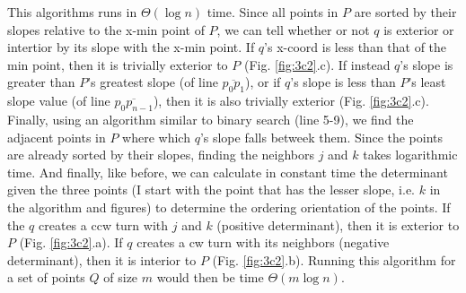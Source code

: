 \documentclass [12pt]{article}
\begin{document}
\begin{enumerate}[label=(\alph*)]
        This algorithms runs in $\Theta(\log n)$ time. Since all points in $P$ are sorted by their slopes relative to the x-min point of $P$, we can tell whether or not $q$ is exterior or intertior by its slope with the x-min point. If $q$'s x-coord is less than that of the min point, then it is trivially exterior to $P$ (Fig. \ref{fig:3c2}.c). If instead $q$'s slope is greater than $P$'s greatest slope (of line $\overline{p_0 p_1}$), or if $q$'s slope is less than $P$'s least slope value (of line $\overline{p_0 p_{n-1}}$), then it is also trivially exterior (Fig. \ref{fig:3c2}.c). Finally, using an algorithm similar to binary search (line 5-9), we find the adjacent points in $P$ where which $q$'s slope falls betweek them. Since the points are already sorted by their slopes, finding the neighbors $j$ and $k$ takes logarithmic time. And finally, like before, we can calculate in constant time the determinant given the three points (I start with the point that has the lesser slope, i.e. $k$ in the algorithm and figures) to determine the ordering orientation of the points. If the $q$ creates a ccw turn with $j$ and $k$ (positive determinant), then it is exterior to $P$ (Fig. \ref{fig:3c2}.a). If $q$ creates a cw turn with its neighbors (negative determinant), then it is interior to $P$ (Fig. \ref{fig:3c2}.b). Running this algorithm for a set of points $Q$ of size $m$ would then be time $\Theta(m \log n)$.
        

\end{enumerate}
\end{document}
